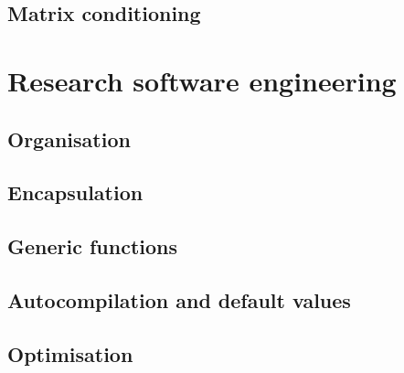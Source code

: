 \subsection{Matrix conditioning}



\section{Research software engineering}
\subsection{Organisation}
\subsection{Encapsulation}
\subsection{Generic functions}
\subsection{Autocompilation and default values}
\subsection{Optimisation}


